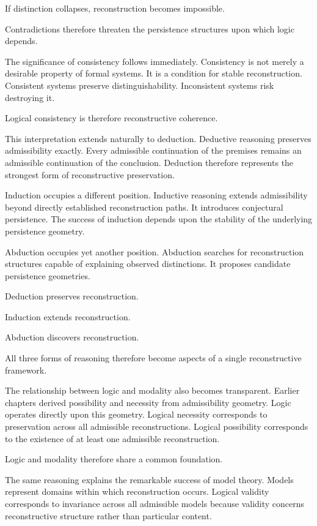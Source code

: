 \documentclass[12pt,oneside]{article}
\theoremstyle{definition}
\begin{document}
If distinction collapses, reconstruction becomes impossible.

Contradictions therefore threaten the persistence structures upon which logic depends.

The significance of consistency follows immediately. Consistency is not merely a desirable property of formal systems. It is a condition for stable reconstruction. Consistent systems preserve distinguishability. Inconsistent systems risk destroying it.

Logical consistency is therefore reconstructive coherence.

This interpretation extends naturally to deduction. Deductive reasoning preserves admissibility exactly. Every admissible continuation of the premises remains an admissible continuation of the conclusion. Deduction therefore represents the strongest form of reconstructive preservation.

Induction occupies a different position. Inductive reasoning extends admissibility beyond directly established reconstruction paths. It introduces conjectural persistence. The success of induction depends upon the stability of the underlying persistence geometry.

Abduction occupies yet another position. Abduction searches for reconstruction structures capable of explaining observed distinctions. It proposes candidate persistence geometries.

Deduction preserves reconstruction.

Induction extends reconstruction.

Abduction discovers reconstruction.

All three forms of reasoning therefore become aspects of a single reconstructive framework.

The relationship between logic and modality also becomes transparent. Earlier chapters derived possibility and necessity from admissibility geometry. Logic operates directly upon this geometry. Logical necessity corresponds to preservation across all admissible reconstructions. Logical possibility corresponds to the existence of at least one admissible reconstruction.

Logic and modality therefore share a common foundation.

The same reasoning explains the remarkable success of model theory. Models represent domains within which reconstruction occurs. Logical validity corresponds to invariance across all admissible models because validity concerns reconstructive structure rather than particular content.
\end{document}
